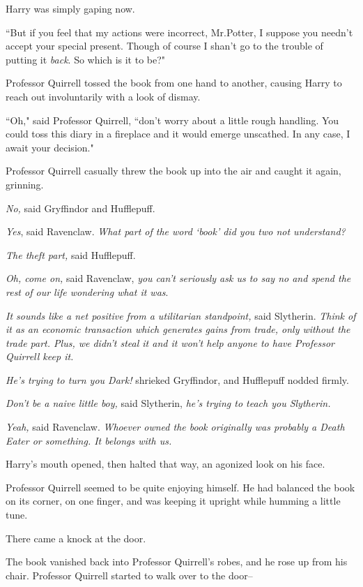 Harry was simply gaping now.

``But if you feel that my actions were incorrect, Mr.\?Potter, I suppose you needn't accept your special present. Though of course I shan't go to the trouble of putting it \emph{back}. So which is it to be?"

Professor Quirrell tossed the book from one hand to another, causing Harry to reach out involuntarily with a look of dismay.

``Oh," said Professor Quirrell, ``don't worry about a little rough handling. You could toss this diary in a fireplace and it would emerge unscathed. In any case, I await your decision."

Professor Quirrell casually threw the book up into the air and caught it again, grinning.

\emph{No,} said Gryffindor and Hufflepuff.

\emph{Yes}, said Ravenclaw. \emph{What part of the word `book' did you two not understand?}

\emph{The theft part,} said Hufflepuff.

\emph{Oh, come on,} said Ravenclaw, \emph{you can't seriously ask us to say no and spend the rest of our life wondering what it was}.

\emph{It sounds like a net positive from a utilitarian standpoint,} said Slytherin. \emph{Think of it as an economic transaction which generates gains from trade, only without the trade part. Plus, \emph{we} didn't steal it and it won't help anyone to have Professor Quirrell keep it.}

\emph{He's trying to turn you Dark!} shrieked Gryffindor, and Hufflepuff nodded firmly.

\emph{Don't be a naive little boy,} said Slytherin, \emph{he's trying to teach you Slytherin.}

\emph{Yeah,} said Ravenclaw. \emph{Whoever owned the book originally was probably a Death Eater or something. It belongs with us.}

Harry's mouth opened, then halted that way, an agonized look on his face.

Professor Quirrell seemed to be quite enjoying himself. He had balanced the book on its corner, on one finger, and was keeping it upright while humming a little tune.

There came a knock at the door.

The book vanished back into Professor Quirrell's robes, and he rose up from his chair. Professor Quirrell started to walk over to the door\---

